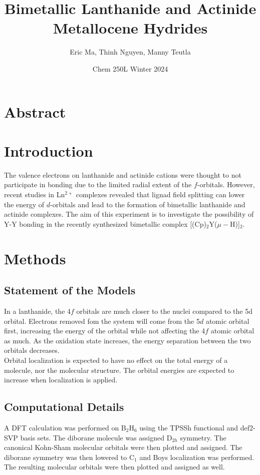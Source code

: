 \documentclass{article}
\title{Bimetallic Lanthanide and Actinide Metallocene Hydrides}
\author{Eric Ma, Thinh Nguyen, Manny Teutla}
\date{Chem 250L Winter 2024}
\begin{document}
\maketitle

\section{Abstract} %

\section{Introduction} %
The valence electrons on lanthanide and actinide cations were thought to not participate in bonding due to the limited radial extent of the $f$-orbitals.
However, recent studies in Ln$^{2+}$ complexes revealed that lignad field splitting can lower the energy of $d$-orbitals and lead to the formation of bimetallic lanthanide and actinide complexes.
The aim of this experiment is to investigate the possibility of Y-Y bonding in the recently synthesized bimetallic complex [(Cp)$_2$Y($\mu - $H)]$_2$. \\

\section{Methods} %
\subsection{Statement of the Models} %
In a lanthanide, the 4$f$ orbitals are much closer to the nuclei compared to the 5d orbital. %
Electrons removed fom the system will come from the 5$d$ atomic orbital first, increasing the energy of the orbital while not affecting the 4$f$ atomic orbital as much. 
As the oxidation state increaes, the energy separation between the two orbitals decreases. \\
Orbital localization is expected to have no effect on the total energy of a molecule, nor the molecular structure.
The orbital energies are expected to increase when localization is applied.

\subsection{Computational Details}
A DFT calculation was performed on B$_2$H$_6$ using the TPSSh functional and def2-SVP basis sets.
The diborane molecule was assigned D$_{2h}$ symmetry.
The canonical Kohn-Sham molecular orbitals were then plotted and assigned. %
The diborane symmetry was then lowered to C$_1$ and Boys localization was performed.
The resulting molecular orbitals were then plotted and assigned as well.
\end{document}

